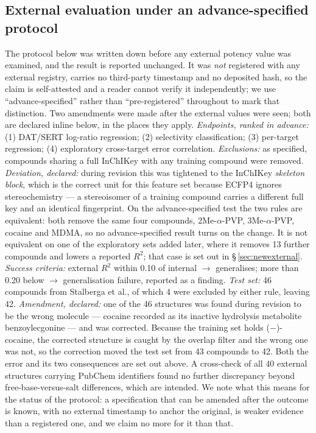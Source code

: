 \documentclass[11pt,a4paper]{article}
\begin{document}
\subsection{External evaluation under an advance-specified protocol}
\label{sec:prereg-protocol}
The protocol below was written down before any external potency value was
examined, and the result is reported unchanged. It was \emph{not} registered
with any external registry, carries no third-party timestamp and no deposited
hash, so the claim is self-attested and a reader cannot verify it independently;
we use ``advance-specified'' rather than ``pre-registered'' throughout to mark
that distinction. Two amendments were made after the external values were seen; both
are declared inline below, in the places they apply.
\textit{Endpoints, ranked in advance:} (1) DAT/SERT log-ratio regression;
(2) selectivity classification; (3) per-target regression; (4) exploratory cross-target
error correlation. \textit{Exclusions:} as specified, compounds sharing a full InChIKey
with any training compound were removed. \textit{Deviation, declared:} during revision
this was tightened to the InChIKey \emph{skeleton block}, which is the correct unit for
this feature set because ECFP4 ignores stereochemistry --- a stereoisomer of a training
compound carries a different full key and an identical fingerprint. On the advance-specified
test the two rules are equivalent: both remove the same four compounds, 2Me-$\alpha$-PVP,
3Me-$\alpha$-PVP, cocaine and MDMA, so no advance-specified result turns on the change. It
is not equivalent on one of the exploratory sets added later, where it removes 13 further
compounds and lowers a reported $R^2$; that case is set out in
\S\,\ref{sec:newexternal}.
\textit{Success criteria:} external $R^2$ within 0.10 of internal $\rightarrow$
generalises; more than 0.20 below $\rightarrow$ generalisation failure, reported as a
finding. \textit{Test set:} 46 compounds from Stalberga et al.\cite{Stalberga2026}, of which 4
were excluded by either rule, leaving 42. \textit{Amendment, declared:} one of the 46
structures was found during revision to be the wrong molecule --- cocaine recorded as its
inactive hydrolysis metabolite benzoylecgonine --- and was corrected. Because the training
set holds ($-$)-cocaine, the corrected structure is caught by the overlap filter and the
wrong one was not, so the correction moved the test set from 43 compounds to 42. Both the
error and its two consequences are set out above. A cross-check of all 40 external
structures carrying PubChem identifiers found no further discrepancy beyond
free-base-versus-salt differences, which are intended. We note what this means for
the status of the protocol: a specification that can be amended after the outcome is known,
with no external timestamp to anchor the original, is weaker evidence than a registered one,
and we claim no more for it than that.
\end{document}
